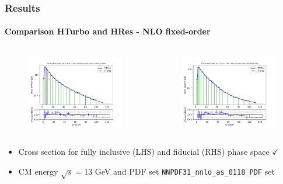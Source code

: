 \documentclass[aspectratio=43]{beamer}
\begin{document}
\begin{frame}
	
	\frametitle{Results}
	\framesubtitle{Comparison HTurbo and HRes - NLO fixed-order}
	
	\footnotesize
	
	\begin{columns}
		
		
		\begin{figure}
			\includegraphics[width = 7cm]{plots/part3/chapter6/nnlo-fo-1.png}
		\end{figure}
		
		
		\begin{figure}
			\includegraphics[width = 7cm]{plots/part3/chapter6/nnlo-fo-fid-1.png}
		\end{figure}
		
	\end{columns}
	
	\begin{itemize}
		\item Cross section for fully inclusive (LHS) and fiducial (RHS) phase space {\color{darkgreen}$\checkmark$} 
		\item CM energy $\sqrt s = 13$ GeV and PDF set \texttt{NNPDF31\_nnlo\_as\_0118 PDF} set
	\end{itemize}

\end{frame}
\end{document}
